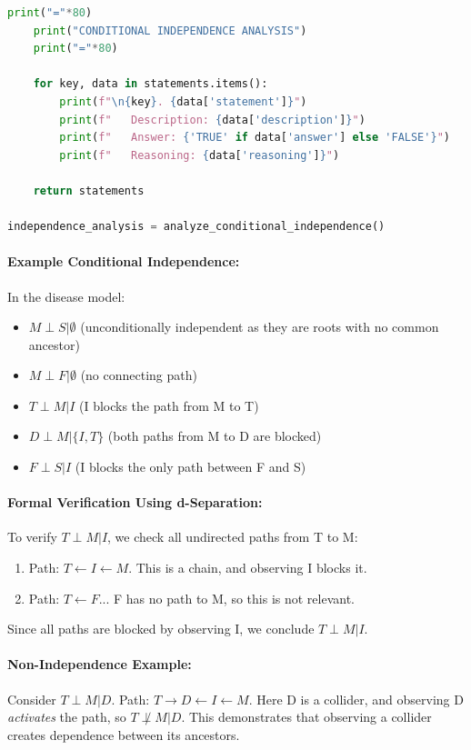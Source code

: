 \documentclass[conference]{IEEEtran}
\begin{document}
\begin{lstlisting}[language=Python, basicstyle=\small\ttfamily]
    print("="*80)
    print("CONDITIONAL INDEPENDENCE ANALYSIS")
    print("="*80)

    for key, data in statements.items():
        print(f"\n{key}. {data['statement']}")
        print(f"   Description: {data['description']}")
        print(f"   Answer: {'TRUE' if data['answer'] else 'FALSE'}")
        print(f"   Reasoning: {data['reasoning']}")

    return statements

independence_analysis = analyze_conditional_independence()
\end{lstlisting}

\paragraph{Example Conditional Independence:}
In the disease model:
\begin{itemize}
    \item $M \perp S | \emptyset$ (unconditionally independent as they are roots with no common ancestor)
    \item $M \perp F | \emptyset$ (no connecting path)
    \item $T \perp M | I$ (I blocks the path from M to T)
    \item $D \perp M | \{I, T\}$ (both paths from M to D are blocked)
    \item $F \perp S | I$ (I blocks the only path between F and S)
\end{itemize}

\paragraph{Formal Verification Using d-Separation:}
To verify $T \perp M | I$, we check all undirected paths from T to M:
\begin{enumerate}
    \item Path: $T \leftarrow I \leftarrow M$. This is a chain, and observing I blocks it.
    \item Path: $T \leftarrow F$... F has no path to M, so this is not relevant.
\end{enumerate}

Since all paths are blocked by observing I, we conclude $T \perp M | I$.

\paragraph{Non-Independence Example:}
Consider $T \perp M | D$. Path: $T \rightarrow D \leftarrow I \leftarrow M$. Here D is a collider, and observing D \textit{activates} the path, so $T \not\perp M | D$. This demonstrates that observing a collider creates dependence between its ancestors.
\end{document}
